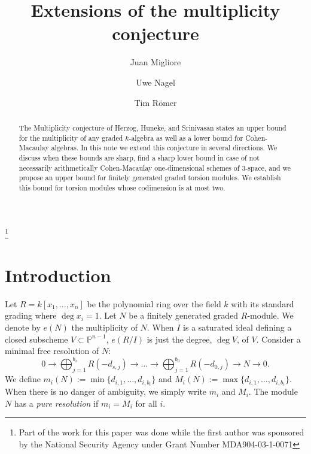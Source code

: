 \documentclass[12pt,twoside]{amsart}
\numberwithin{equation}{section}
\theoremstyle{definition}
\begin{document}
\title{Extensions of the multiplicity conjecture}

\author{Juan Migliore}
\address{Department of Mathematics, University of Notre Dame,
Notre Dame, IN 46556, USA}
\author{Uwe Nagel}
\address
{Department of Mathematics, University of Kentucky,
715 Patterson Office Tower, Lexington, KY 40506-0027, USA}
\author{Tim R\"omer}
\address{FB Mathematik/Informatik,
Universit\"at Osnabr\"uck, 49069 Osnabr\"uck, Germany}

\thanks{Part of the work for this  paper was done while the first author was
sponsored by the National Security Agency  under Grant Number MDA904-03-1-0071}

\begin{abstract}
The Multiplicity conjecture of Herzog, Huneke, and Srinivasan states an upper bound for
the multiplicity of any graded $k$-algebra as well as a lower bound for Cohen-Macaulay
algebras. In this note we extend this conjecture in several directions. We discuss when
these bounds are sharp, find a sharp lower bound in case of not necessarily
arithmetically Cohen-Macaulay one-dimensional schemes of 3-space, and we propose an upper
bound for finitely generated graded torsion modules. We establish this bound for torsion
modules whose codimension is at most two.
\end{abstract}


\maketitle
\tableofcontents

\section{Introduction}



Let $R = k[x_1,\dots,x_n]$ be the polynomial ring over the field $k$ with its standard
grading where $\deg x_i = 1$.  Let $N$ be a finitely generated graded $R$-module. We
denote by $e(N)$ the multiplicity of $N$. When $I$ is a saturated ideal defining a closed
subscheme $V \subset {\mathbb P}^{n-1}$, $e(R/I)$ is just the degree, $\deg V$, of $V$.
Consider a minimal free resolution of $N$:
\[
0 \rightarrow \bigoplus_{j=1}^{b_s} R(-d_{s,j}) \rightarrow \dots \rightarrow
\bigoplus_{j=1}^{b_0} R(-d_{0,j})  \rightarrow N \rightarrow 0.
\]
We define $m_i (N)  := \min \{ d_{i,1}, \dots, d_{i,b_i} \}$ and $M_i (N) := \max \{
d_{i,1}, \dots, d_{i,b_i} \}$.  When there is no danger of ambiguity, we simply write
$m_i$ and $M_i$. The module $N$ has a {\em pure resolution} if $m_i = M_i$ for all $i$.
\end{document}
